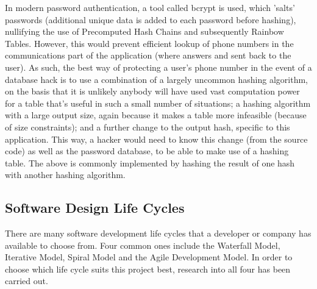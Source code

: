 \documentclass{article}
\begin{document}
In modern password authentication, a tool called bcrypt is used, which 'salts' passwords (additional unique data is added to each password before hashing), nullifying the use of Precomputed Hash Chains and subsequently Rainbow Tables.  However, this would prevent efficient lookup of phone numbers in the communications part of the application (where answers and sent back to the user).  As such, the best way of protecting a user's phone number in the event of a database hack is to use a combination of a largely uncommon hashing algorithm, on the basis that it is unlikely anybody will have used vast computation power for a table that's useful in such a small number of situations; a hashing algorithm with a large output size, again because it makes a table more infeasible (because of size constraints); and a further change to the output hash, specific to this application.  This way, a hacker would need to know this change (from the source code) as well as the password database, to be able to make use of a hashing table.  The above is commonly implemented by hashing the result of one hash with another hashing algorithm.

\subsection{Software Design Life Cycles}
There are many software development life cycles that a developer or company has available to choose from.  Four common ones include the Waterfall Model, Iterative Model, Spiral Model and the Agile Development Model.  In order to choose which life cycle suits this project best, research into all four has been carried out.

\end{document}
